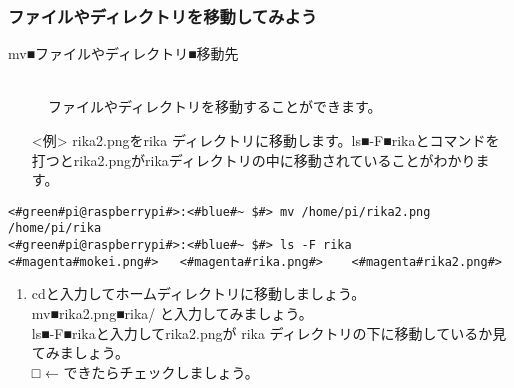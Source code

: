 \subsubsection{ファイルやディレクトリを移動してみよう}
\begin{description}
\item[mv■ファイルやディレクトリ■移動先]\mbox{}\\
ファイルやディレクトリを移動することができます。
\end{description}
\begin{itemize}
\item[<例>]rika2.pngをrika ディレクトリに移動します。ls■-F■rikaとコマンドを打つとrika2.pngがrikaディレクトリの中に移動されていることがわかります。
\end{itemize}
\begin{lstlisting}[caption=mvの例, label=mv]
<#green#pi@raspberrypi#>:<#blue#~ $#> mv /home/pi/rika2.png /home/pi/rika
<#green#pi@raspberrypi#>:<#blue#~ $#> ls -F rika
<#magenta#mokei.png#>	<#magenta#rika.png#>	<#magenta#rika2.png#>
\end{lstlisting}

\begin{tcolorbox}[title=\useOmetoi]
\begin{enumerate}
\item cdと入力してホームディレクトリに移動しましょう。\\ mv■rika2.png■rika/ と入力してみましょう。\\ls■-F■rikaと入力してrika2.pngが rika ディレクトリの下に移動しているか見てみましょう。\\□ ← できたらチェックしましょう。
\end{enumerate}
\end{tcolorbox}